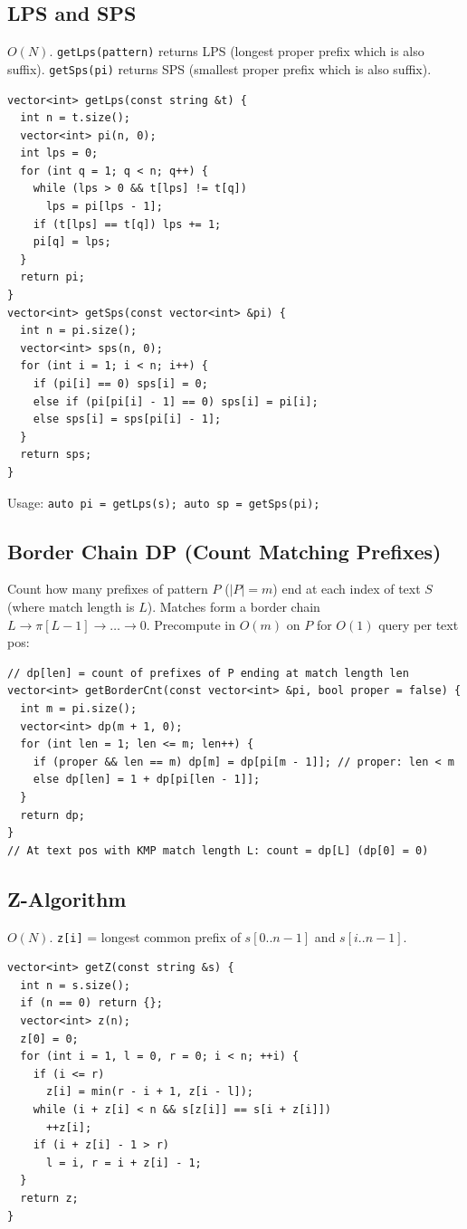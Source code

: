 \subsection{LPS and SPS}
$O(N)$. \texttt{getLps(pattern)} returns LPS (longest proper prefix which is also suffix). \texttt{getSps(pi)} returns SPS (smallest proper prefix which is also suffix).
\begin{verbatim}
vector<int> getLps(const string &t) {
  int n = t.size();
  vector<int> pi(n, 0);
  int lps = 0;
  for (int q = 1; q < n; q++) {
    while (lps > 0 && t[lps] != t[q])
      lps = pi[lps - 1];
    if (t[lps] == t[q]) lps += 1;
    pi[q] = lps;
  }
  return pi;
}
vector<int> getSps(const vector<int> &pi) {
  int n = pi.size();
  vector<int> sps(n, 0);
  for (int i = 1; i < n; i++) {
    if (pi[i] == 0) sps[i] = 0;
    else if (pi[pi[i] - 1] == 0) sps[i] = pi[i];
    else sps[i] = sps[pi[i] - 1];
  }
  return sps;
}
\end{verbatim}
Usage: \texttt{auto pi = getLps(s); auto sp = getSps(pi);}

\subsection{Border Chain DP (Count Matching Prefixes)}
Count how many prefixes of pattern $P$ ($|P|=m$) end at each index of text $S$ (where match length is $L$).
Matches form a border chain $L \to \pi[L-1] \to \dots \to 0$. Precompute in $O(m)$ on $P$ for $O(1)$ query per text pos:
\begin{verbatim}
// dp[len] = count of prefixes of P ending at match length len
vector<int> getBorderCnt(const vector<int> &pi, bool proper = false) {
  int m = pi.size();
  vector<int> dp(m + 1, 0);
  for (int len = 1; len <= m; len++) {
    if (proper && len == m) dp[m] = dp[pi[m - 1]]; // proper: len < m
    else dp[len] = 1 + dp[pi[len - 1]];
  }
  return dp;
}
// At text pos with KMP match length L: count = dp[L] (dp[0] = 0)
\end{verbatim}
\subsection{Z-Algorithm}
$O(N)$. \texttt{z[i]} = longest common prefix of $s[0..n-1]$ and $s[i..n-1]$.
\begin{verbatim}
vector<int> getZ(const string &s) {
  int n = s.size();
  if (n == 0) return {};
  vector<int> z(n);
  z[0] = 0;
  for (int i = 1, l = 0, r = 0; i < n; ++i) {
    if (i <= r)
      z[i] = min(r - i + 1, z[i - l]);
    while (i + z[i] < n && s[z[i]] == s[i + z[i]])
      ++z[i];
    if (i + z[i] - 1 > r)
      l = i, r = i + z[i] - 1;
  }
  return z;
}
\end{verbatim}
